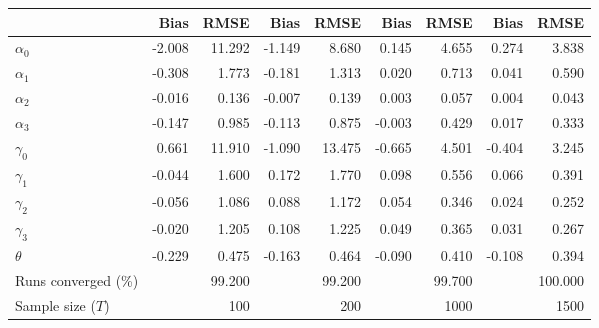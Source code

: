 
\begin{tabular}[t]{lrrrrrrrr}
\toprule
  & Bias & RMSE & Bias & RMSE & Bias & RMSE & Bias & RMSE\\
\midrule
$\alpha_{0}$ & -2.008 & 11.292 & -1.149 & 8.680 & 0.145 & 4.655 & 0.274 & 3.838\\
$\alpha_{1}$ & -0.308 & 1.773 & -0.181 & 1.313 & 0.020 & 0.713 & 0.041 & 0.590\\
$\alpha_{2}$ & -0.016 & 0.136 & -0.007 & 0.139 & 0.003 & 0.057 & 0.004 & 0.043\\
$\alpha_{3}$ & -0.147 & 0.985 & -0.113 & 0.875 & -0.003 & 0.429 & 0.017 & 0.333\\
$\gamma_{0}$ & 0.661 & 11.910 & -1.090 & 13.475 & -0.665 & 4.501 & -0.404 & 3.245\\
$\gamma_{1}$ & -0.044 & 1.600 & 0.172 & 1.770 & 0.098 & 0.556 & 0.066 & 0.391\\
$\gamma_{2}$ & -0.056 & 1.086 & 0.088 & 1.172 & 0.054 & 0.346 & 0.024 & 0.252\\
$\gamma_{3}$ & -0.020 & 1.205 & 0.108 & 1.225 & 0.049 & 0.365 & 0.031 & 0.267\\
$\theta$ & -0.229 & 0.475 & -0.163 & 0.464 & -0.090 & 0.410 & -0.108 & 0.394\\
Runs converged (\%) &  & 99.200 &  & 99.200 &  & 99.700 &  & 100.000\\
Sample size ($T$) &  & 100 &  & 200 &  & 1000 &  & 1500\\
\bottomrule
\end{tabular}
